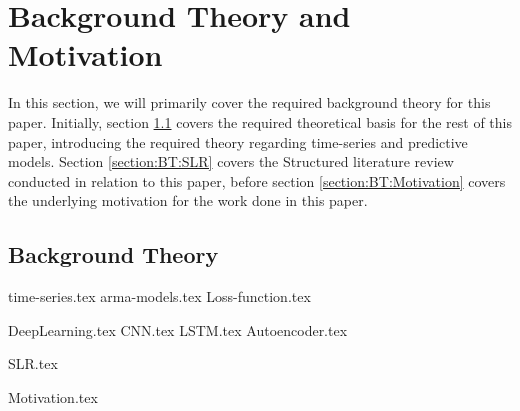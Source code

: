 \chapter{Background Theory and Motivation}\label{T-B}
\label{cha:TheoryAndBackground}


In this section, we will primarily cover the required background theory for this paper.
Initially, section \ref{section:BT:BackgroundTheory} covers the required theoretical basis for the rest of this paper,
introducing the required theory regarding time-series and predictive models.
Section \ref{section:BT:SLR} covers the Structured literature review conducted in relation to this paper,
before section \ref{section:BT:Motivation} covers the underlying motivation for the work done in this paper.
 


\section{Background Theory}
\label{section:BT:BackgroundTheory}
{time-series.tex}
{arma-models.tex}
{Loss-function.tex}

{DeepLearning.tex}
{CNN.tex}
{LSTM.tex}
{Autoencoder.tex}



{SLR.tex}


{Motivation.tex}
